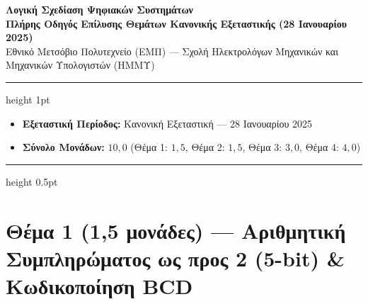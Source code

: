 \documentclass[11pt, a4paper]{article}
\begin{document}
\begin{center}
    {\LARGE \textbf{Λογική Σχεδίαση Ψηφιακών Συστημάτων}}\\[0.4em]
    {\large \textbf{Πλήρης Οδηγός Επίλυσης Θεμάτων Κανονικής Εξεταστικής (28 Ιανουαρίου 2025)}}\\[0.4em]
    {\normalsize Εθνικό Μετσόβιο Πολυτεχνείο (ΕΜΠ) --- Σχολή Ηλεκτρολόγων Μηχανικών και Μηχανικών Υπολογιστών (ΗΜΜΥ)}
\end{center}

\vspace{0.3em}
\hrule height 1pt
\vspace{0.6em}

\begin{itemize}[noitemsep, topsep=0pt]
    \item \textbf{Εξεταστική Περίοδος:} Κανονική Εξεταστική --- 28 Ιανουαρίου 2025
    \item \textbf{Σύνολο Μονάδων:} $10{,}0$ (Θέμα 1: $1{,}5$, Θέμα 2: $1{,}5$, Θέμα 3: $3{,}0$, Θέμα 4: $4{,}0$)
\end{itemize}

\vspace{0.3em}
\hrule height 0.5pt
\vspace{0.8em}

\section*{Θέμα 1 (1,5 μονάδες) --- Αριθμητική Συμπληρώματος ως προς 2 (5-bit) \& Κωδικοποίηση BCD}
\end{document}
